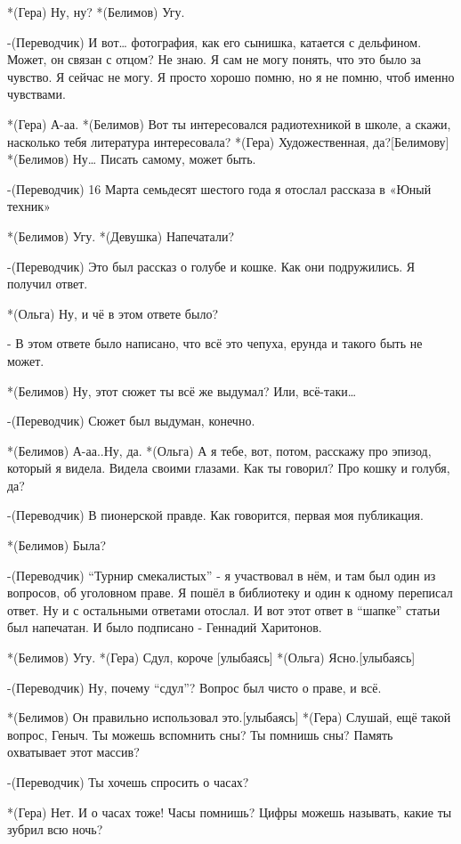 *(Гера) Ну, ну?
*(Белимов) Угу.

-(Переводчик) И вот… фотография, как его сынишка, катается с дельфином. Может, он связан с отцом? Не знаю. Я сам не могу понять, что это было за чувство. Я сейчас не могу. Я просто хорошо помню, но я не помню, чтоб именно чувствами.

*(Гера) А-аа.
*(Белимов) Вот ты интересовался радиотехникой в школе, а скажи, насколько тебя  литература интересовала?
*(Гера) Художественная, да?[Белимову]
*(Белимов) Ну… Писать самому, может быть.

-(Переводчик) 16 Марта семьдесят шестого года  я отослал рассказа в «Юный техник»

*(Белимов) Угу.
*(Девушка) Напечатали?

-(Переводчик) Это был рассказ о голубе и кошке. Как они подружились. Я получил ответ.

*(Ольга) Ну, и чё в этом ответе было?

- В этом ответе было написано, что всё это чепуха, ерунда и такого быть не может.

*(Белимов) Ну, этот сюжет ты всё же выдумал? Или, всё-таки…

-(Переводчик) Сюжет был выдуман, конечно.

*(Белимов) А-аа..Ну, да.
*(Ольга) А я тебе, вот, потом,  расскажу про эпизод, который я видела. Видела своими глазами. Как ты говорил? Про кошку и голубя, да?

-(Переводчик) В пионерской правде. Как говорится, первая моя публикация.

*(Белимов) Была?

-(Переводчик) “Турнир смекалистых” - я участвовал в нём, и там был один из вопросов, об уголовном праве. Я пошёл в библиотеку и один к одному переписал ответ. Ну и с остальными ответами отослал. И вот этот ответ в “шапке” статьи был напечатан. И было подписано  - Геннадий Харитонов.

*(Белимов) Угу.
*(Гера) Сдул, короче [улыбаясь]
*(Ольга) Ясно.[улыбаясь]

-(Переводчик) Ну, почему “сдул”? Вопрос был чисто о праве, и всё.

*(Белимов) Он правильно использовал это.[улыбаясь]
*(Гера) Слушай, ещё такой вопрос, Геныч. Ты можешь вспомнить сны? Ты помнишь сны? Память охватывает этот массив?

-(Переводчик) Ты хочешь спросить о часах? 

*(Гера) Нет. И о часах тоже! Часы помнишь? Цифры можешь называть, какие ты зубрил всю ночь?

